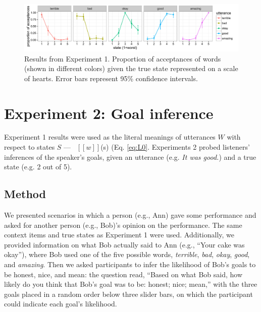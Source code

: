 \documentclass[10pt,letterpaper]{article}
\newcommand{\denote}[1]{\mbox{ $[\![ #1 ]\!]$}}
\begin{document}
\begin{figure}[t]
\begin{center} 
  \includegraphics[width=.9\textwidth]{figures/exp1.pdf}
  \caption{\label{fig:exp1} Results from Experiment 1. Proportion of acceptances of words (shown in different colors) given the true state represented on a scale of hearts. Error bars represent 95\% confidence intervals.}
  \end{center} 
\end{figure}

\section{Experiment 2: Goal inference}

Experiment 1 results were used as the literal meanings of utterances $W$ with respect to states $S$ --- \denote{w}(s) (Eq. \ref{eq:L0}.
Experiments 2 probed listeners' inferences of the speaker's goals, given an utterance (e.g. \emph{It was good.}) and a true state (e.g. 2 out of 5). 

\subsection{Method} 

We presented scenarios in which a person (e.g., Ann) gave some performance and asked for another person (e.g., Bob)'s opinion on the performance. The same context items and true states as Experiment 1 were used. Additionally, we provided information on what Bob actually said to Ann (e.g., ``Your cake was okay''), where Bob used one of the five possible words,  \emph{terrible}, \emph{bad}, \emph{okay}, \emph{good}, and \emph{amazing}. Then we asked participants to infer the likelihood of Bob's goals to be honest, nice, and mean: the question read, ``Based on what Bob said, how likely do you think that Bob's goal was to be: honest; nice; mean,'' with the three goals placed in a random order below three slider bars, on which the participant could indicate each goal's likelihood.
\end{document}
